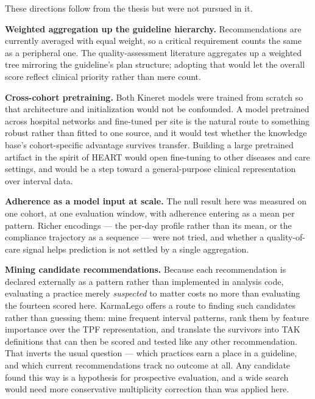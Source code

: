 
These directions follow from the thesis but were not pursued in it.

\textbf{Weighted aggregation up the guideline hierarchy.} Recommendations are currently averaged with equal weight, so a critical requirement counts the same as a peripheral one. The quality-assessment literature aggregates up a weighted tree mirroring the guideline's plan structure; adopting that would let the overall score reflect clinical priority rather than mere count.

\textbf{Cross-cohort pretraining.} Both Kineret models were trained from scratch so that architecture and initialization would not be confounded. A model pretrained across hospital networks and fine-tuned per site is the natural route to something robust rather than fitted to one source, and it would test whether the knowledge base's cohort-specific advantage survives transfer. Building a large pretrained artifact in the spirit of HEART \citep{huang2024heart} would open fine-tuning to other diseases and care settings, and would be a step toward a general-purpose clinical representation over interval data.

\textbf{Adherence as a model input at scale.} The null result here was measured on one cohort, at one evaluation window, with adherence entering as a mean per pattern. Richer encodings --- the per-day profile rather than its mean, or the compliance trajectory as a sequence --- were not tried, and whether a quality-of-care signal helps prediction is not settled by a single aggregation.

\textbf{Mining candidate recommendations.} Because each recommendation is declared externally as a pattern rather than implemented in analysis code, evaluating a practice merely \emph{suspected} to matter costs no more than evaluating the fourteen scored here. KarmaLego offers a route to finding such candidates rather than guessing them: mine frequent interval patterns, rank them by feature importance over the TPF representation, and translate the survivors into TAK definitions that can then be scored and tested like any other recommendation. That inverts the usual question --- which practices earn a place in a guideline, and which current recommendations track no outcome at all. Any candidate found this way is a hypothesis for prospective evaluation, and a wide search would need more conservative multiplicity correction than was applied here.

